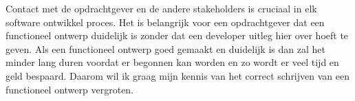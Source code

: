 Contact met de opdrachtgever en de andere stakeholders is cruciaal in elk software ontwikkel proces. Het is belangrijk voor een opdrachtgever dat een functioneel ontwerp duidelijk is zonder dat een developer uitleg hier over hoeft te geven. Als een functioneel ontwerp goed gemaakt en duidelijk is dan zal het minder lang duren voordat er begonnen kan worden en zo wordt er veel tijd en geld bespaard. Daarom wil ik graag mijn kennis van het correct schrijven van een functioneel ontwerp vergroten.

\clearpage

